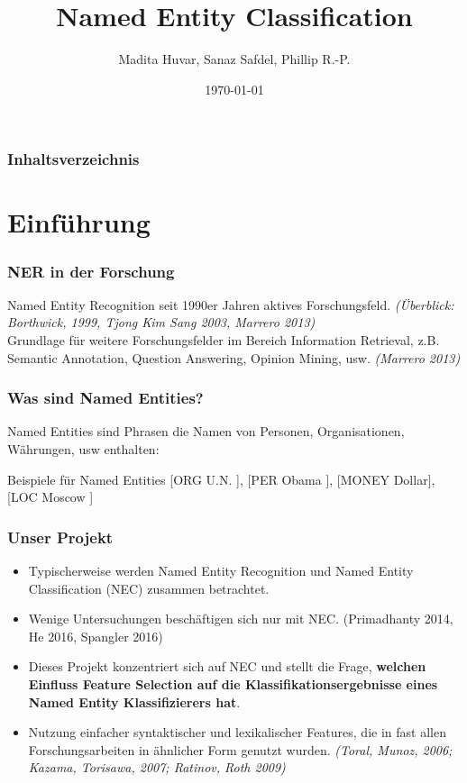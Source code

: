 \documentclass{beamer}
\title{Named Entity Classification}
\author{Madita Huvar, Sanaz Safdel, Phillip R.-P.}
\date{\today}
\begin{document}
\begin{frame}
\titlepage
\end{frame} 

\begin{frame}
\frametitle{Inhaltsverzeichnis}
\tableofcontents
\end{frame} 


\section{Einführung}
\begin{frame}
	\frametitle{NER in der Forschung}
	Named Entity Recognition seit 1990er Jahren aktives Forschungsfeld. \textit{(Überblick: Borthwick, 1999, Tjong Kim Sang 2003, Marrero 2013)}\\
	
	Grundlage für weitere Forschungsfelder im Bereich Information Retrieval, z.B. Semantic Annotation, Question Answering, Opinion Mining, usw. \textit{(Marrero 2013)}
\end{frame}
\begin{frame}
	\frametitle{Was sind Named Entities?}
	Named Entities sind Phrasen die Namen von Personen, Organisationen, Währungen, usw enthalten:\\
	\begin{exampleblock}{Beispiele für Named Entities}
		[ORG U.N. ], [PER Obama ], [MONEY Dollar], [LOC Moscow ] 
	\end{exampleblock}

\end{frame}
	\begin{frame}
		\frametitle{Unser Projekt}
		\begin{itemize}
			\item <+->Typischerweise werden Named Entity Recognition und Named Entity Classification (NEC) zusammen betrachtet.
			\item <+->Wenige Untersuchungen beschäftigen sich nur mit NEC. (Primadhanty 2014, He 2016, Spangler 2016)
			\item <+->Dieses Projekt konzentriert sich auf NEC und stellt die Frage, \textbf{welchen Einfluss Feature Selection auf die Klassifikationsergebnisse eines Named Entity Klassifizierers hat}.
			\item <+->Nutzung einfacher syntaktischer und lexikalischer Features, die in fast allen Forschungsarbeiten in ähnlicher Form genutzt wurden. \textit{(Toral, Munoz, 2006; Kazama, Torisawa, 2007; Ratinov, Roth 2009)} 
		\end{itemize}	

	\end{frame}
\end{document}
